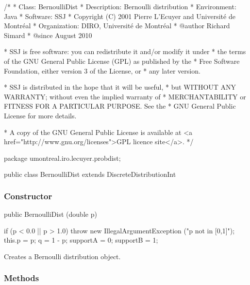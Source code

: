 \begin{code}
\begin{hide}
/*
 * Class:        BernoulliDist
 * Description:  Bernoulli distribution
 * Environment:  Java
 * Software:     SSJ 
 * Copyright (C) 2001  Pierre L'Ecuyer and Université de Montréal
 * Organization: DIRO, Université de Montréal
 * @author       Richard Simard
 * @since        August 2010

 * SSJ is free software: you can redistribute it and/or modify it under
 * the terms of the GNU General Public License (GPL) as published by the
 * Free Software Foundation, either version 3 of the License, or
 * any later version.

 * SSJ is distributed in the hope that it will be useful,
 * but WITHOUT ANY WARRANTY; without even the implied warranty of
 * MERCHANTABILITY or FITNESS FOR A PARTICULAR PURPOSE.  See the
 * GNU General Public License for more details.

 * A copy of the GNU General Public License is available at
   <a href="http://www.gnu.org/licenses">GPL licence site</a>.
 */
\end{hide}
package umontreal.iro.lecuyer.probdist;


public class BernoulliDist extends DiscreteDistributionInt\begin{hide} {
   private double p;
   private double q;
\end{hide}
\end{code}


\subsubsection* {Constructor}
\begin{code}

   public BernoulliDist (double p)\begin{hide} {
      if (p < 0.0 || p > 1.0)
         throw new IllegalArgumentException ("p not in [0,1]");
      this.p = p;
      q = 1 - p;
      supportA = 0;
      supportB = 1;
   }\end{hide}
\end{code}
\begin{tabb} Creates a Bernoulli distribution object.
\end{tabb}


\subsubsection* {Methods}

